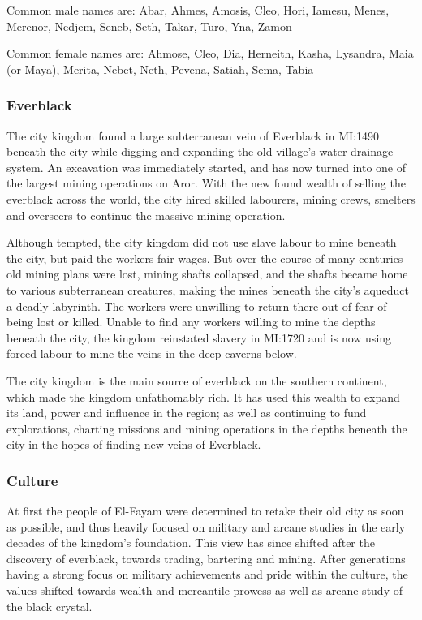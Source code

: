 Common male names are: Abar, Ahmes, Amosis, Cleo, Hori, Iamesu, Menes,
Merenor, Nedjem, Seneb, Seth, Takar, Turo, Yna, Zamon

Common female names are: Ahmose, Cleo, Dia, Herneith, Kasha, Lysandra, Maia
(or Maya), Merita, Nebet, Neth, Pevena, Satiah, Sema, Tabia

\subsubsection{Everblack}

The city kingdom found a large subterranean vein of Everblack in MI:1490
beneath the city while digging and expanding the old village's water drainage
system. An excavation was immediately started, and has now turned into one of
the largest mining operations on Aror. With the new found wealth of selling
the everblack across the world, the city hired skilled labourers, mining
crews, smelters and overseers to continue the massive mining operation.

Although tempted, the city kingdom did not use slave labour to mine beneath
the city, but paid the workers fair wages. But over the course of many
centuries old mining plans were lost, mining shafts collapsed, and the shafts
became home to various subterranean creatures, making the mines beneath the
city's aqueduct a deadly labyrinth. The workers were unwilling to return
there out of fear of being lost or killed. Unable to find any workers willing
to mine the depths beneath the city, the kingdom reinstated slavery in MI:1720
and is now using forced labour to mine the veins in the deep caverns below.

The city kingdom is the main source of everblack on the southern continent,
which made the kingdom unfathomably rich. It has used this wealth to expand
its land, power and influence in the region; as well as continuing to fund
explorations, charting missions and mining operations in the depths beneath
the city in the hopes of finding new veins of Everblack.

\subsubsection{Culture}

At first the people of El-Fayam were determined to retake their old city as
soon as possible, and thus heavily focused on military and arcane studies in
the early decades of the kingdom's foundation. This view has since shifted after
the discovery of everblack, towards trading, bartering and mining. After
generations having a strong focus on military achievements and pride within
the culture, the values shifted towards wealth and mercantile prowess as well
as arcane study of the black crystal.

